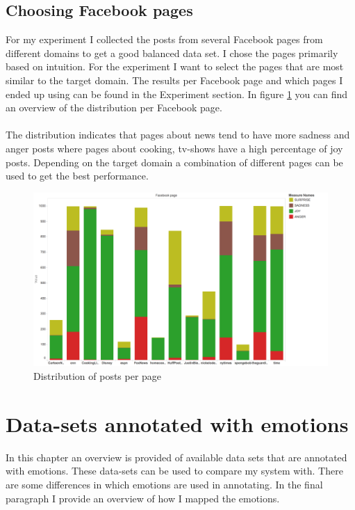 \documentclass[
10pt, %
a4paper, %
oneside, %
headinclude,footinclude, %
BCOR5mm, %
]{scrartcl}
\begin{document}
\subsection{Choosing Facebook pages}
For my experiment I collected the posts from several Facebook pages from different domains to get a good balanced data set. I chose the pages primarily based on intuition. For the experiment I want to select the pages that are most similar to the target domain. The results per Facebook page and which pages I ended up using can be found in the Experiment section. In figure \ref{fig:distribution_facebook} you can find an overview of the distribution per Facebook page. \\\\
The distribution indicates that pages about news tend to have more sadness and anger posts where pages about cooking, tv-shows have a high percentage of joy posts. Depending on the target domain a combination of different pages can be used to get the best performance.
\begin{figure}
    \includegraphics[width=\textwidth,height=\textheight,keepaspectratio]{distribution_facebook.png}  
\caption{Distribution of posts per page}
\label{fig:distribution_facebook}
\end{figure}
\newpage
\section{Data-sets annotated with emotions}
In this chapter an overview is provided of available data sets that are annotated with emotions. These data-sets can be used to compare my system with. There are some differences in which emotions are used in annotating. In the final paragraph I provide an overview of how I mapped the emotions.
\end{document}
